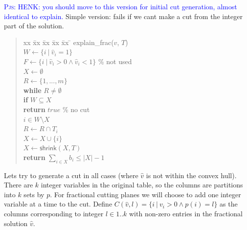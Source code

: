 \documentclass{article}
\newcommand{\pjs}[1]{\textcolor{blue}{\textsc{Pjs:} #1}}
\begin{document}
\pjs{HENK: you should move to this version for initial cut generation, almost identical to \textsf{explain}.}
Simple version: fails if we cant make a cut from the integer part of the solution.
\begin{quote} 
\label{lst:explain_frac}
\begin{tabbing}
    xx \= xx \= xx \= xx \= xx \= \kill
    \textsf{explain\_frac}($\hat{v}$, $T$) \\
    \> $W \gets \{ i ~|~ \hat{v}_i = 1 \}$ \\
    \> $F \gets \{ i ~|~ \hat{v}_i > 0 \wedge \hat{v}_i < 1 \}$ \% not used \\
    \> $X \gets \emptyset$ \\
    \> $R \gets \{1, ..., m\}$ \\
    \> \textbf{while} $R \neq \emptyset$ \\
    \> \> \textbf{if} $W \subseteq X$ \\
    \> \> \> \textbf{return} $true$ \% no cut \\
    \> \>  $i \in W \setminus X$ \\
    \> \> $R \gets R \cap T_i$ \\
    \> \> $X \gets X \cup \{i\}$ \\
    \> $X \gets \textsf{shrink}(X,T)$ \\
    \> \textbf{return} $\sum_{i \in X} b_i \leq |X|-1$
\end{tabbing}
\end{quote}

Lets try to generate a cut in all cases
(where $\hat{v}$ is not within the convex hull).
There are $k$ integer variables in the original table, so the columns are partitions into $k$ sets by $p$. 
For fractional cutting planes we will
choose to add one integer variable at a time to the cut. 
Define $C(\hat{v},l) = \{ i ~|~ v_i > 0 \wedge p(i) = l\}$ as
the columns corresponding to integer $l \in 1..k$ 
with non-zero entries in the fractional solution $\hat{v}$.
\end{document}
